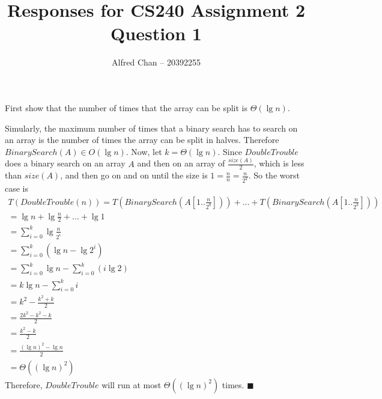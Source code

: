 \documentclass[12pt]{article}
\title{Responses for CS240 Assignment 2 Question 1}
\author{Alfred Chan -- 20392255}
\begin{document}
\maketitle
First show that the number of times that the array can be split is $\Theta(\lg n)$.

Simularly, the maximum number of times that a binary search has to search on an array is the number of times the array can be split in halves.
Therefore $BinarySearch(A) \in O(\lg n)$.
Now, let $k = \Theta(\lg n)$.
Since $DoubleTrouble$ does a binary search on an array $A$ and then on an array of $\frac{size(A)}{2}$, which is less than $size(A)$, and then go on and on until the size is 
$1 = \frac{n}{n} = \frac{n}{2^k}$.
So the worst case is
\begin{gather*}
T(DoubleTrouble(n)) = T(BinarySearch(A[1..\frac{n}{2^0}])) + \dots + T(BinarySearch(A[1 .. \frac{n}{2^k}]))\\
	= \lg n + \lg\frac{n}{2} + \dots + \lg 1\\
	= \sum_{i=0}^{k} \lg \frac{n}{2^i}\\
	= \sum_{i=0}^{k} (\lg n - \lg 2^{i})\\
	= \sum_{i=0}^{k} \lg n - \sum_{i=0}^{k} (i \lg 2)\\
	= k\lg n - \sum_{i=0}^{k} i\\
	= k^2 - \frac{k^2 + k}{2}\\
	= \frac{2k^2 - k^2 - k}{2}\\
	= \frac{k^2 - k}{2}\\
	= \frac{(\lg n)^2 - \lg n}{2}\\
	= \Theta((\lg n)^2)
\end{gather*}
Therefore, $DoubleTrouble$ will run at most $\Theta((\lg n)^2)$ times.
\hfill $\blacksquare$
\end{document}
